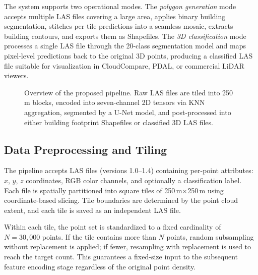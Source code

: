 \documentclass[11pt]{article}
\begin{document}
The system supports two operational modes.
The \emph{polygon generation} mode accepts multiple LAS files covering a large area, applies binary building segmentation, stitches per-tile predictions into a seamless mosaic, extracts building contours, and exports them as Shapefiles.
The \emph{3D classification} mode processes a single LAS file through the 20-class segmentation model and maps pixel-level predictions back to the original 3D points, producing a classified LAS file suitable for visualization in CloudCompare, PDAL, or commercial LiDAR viewers.

\begin{figure}[t]
    \centering
    \caption{Overview of the proposed pipeline. Raw LAS files are tiled into 250\,m blocks, encoded into seven-channel 2D tensors via KNN aggregation, segmented by a U-Net model, and post-processed into either building footprint Shapefiles or classified 3D LAS files.}
    \label{fig:pipeline}
\end{figure}

\subsection{Data Preprocessing and Tiling}
\label{sec:method_preprocessing}

The pipeline accepts LAS files (versions 1.0--1.4) containing per-point attributes: $x$, $y$, $z$ coordinates, RGB color channels, and optionally a classification label.
Each file is spatially partitioned into square tiles of 250\,m$\times$250\,m using coordinate-based slicing.
Tile boundaries are determined by the point cloud extent, and each tile is saved as an independent LAS file.

Within each tile, the point set is standardized to a fixed cardinality of $N = 30{,}000$ points.
If the tile contains more than $N$ points, random subsampling without replacement is applied; if fewer, resampling with replacement is used to reach the target count.
This guarantees a fixed-size input to the subsequent feature encoding stage regardless of the original point density.
\end{document}
